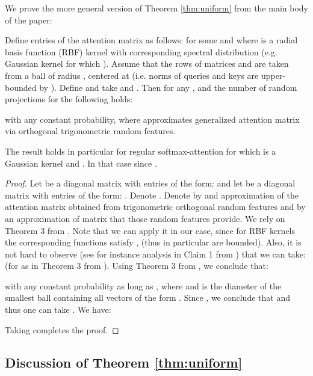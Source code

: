 We prove the more general version of Theorem \ref{thm:uniform} from the main body of the paper: 

\begin{theorem}
\label{uniform_convergence}
Define entries of the attention matrix  as follows:  for some
 and where  is a radial basis function (RBF) kernel \citep{geom} with corresponding spectral distribution  (e.g. Gaussian kernel for which ). Assume that the rows of matrices  and  are taken from a ball  of radius , centered at  (i.e. norms of queries and keys are upper-bounded by ). 
Define  and take  and
.
Then for any , 
and the number of random projections  for  the following holds:

with any constant probability,
where  approximates generalized attention matrix via orthogonal trigonometric random features.
\end{theorem}

The result holds in particular for regular softmax-attention for which  is a Gaussian kernel and . In that case  since .

\begin{proof}
Let  be a diagonal matrix with entries of the form:  and let  be a diagonal matrix with entries of the form: . Denote 
. Denote by  and approximation of the attention matrix obtained from trigonometric orthogonal random features and by  an approximation of matrix  that those random features provide.
We rely on Theorem 3 from \citep{Lin2020DemystifyingOM}.
Note that we can apply it in our case, since for RBF kernels the corresponding functions  satisfy ,  (thus in particular are bounded). Also, it is not hard to observe (see for instance analysis in  Claim 1 from \citep{fourierapprox}) that we can take:  (for  as in Theorem 3 from \citep{Lin2020DemystifyingOM}). 
Using Theorem 3 from \citep{Lin2020DemystifyingOM}, we conclude that:

with any constant probability as long as
,
where  and  is the diameter of the smallest ball  containing all vectors of the form . 
Since , we conclude that  and thus one can take .
We have:

Taking  completes the proof.
\end{proof}

\subsection{Discussion of Theorem \ref{thm:uniform}} \label{sec:ball}

